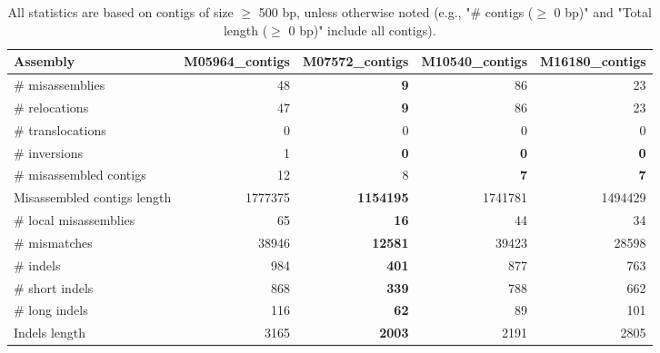 \documentclass[12pt,a4paper]{article}
\begin{document}
\begin{table}[ht]
\begin{center}
\caption{All statistics are based on contigs of size $\geq$ 500 bp, unless otherwise noted (e.g., "\# contigs ($\geq$ 0 bp)" and "Total length ($\geq$ 0 bp)" include all contigs).}
\begin{tabular}{|l*{4}{|r}|}
\hline
Assembly & M05964\_contigs & M07572\_contigs & M10540\_contigs & M16180\_contigs \\ \hline
\# misassemblies & 48 & {\bf 9} & 86 & 23 \\ \hline
\hspace{5mm}\# relocations & 47 & {\bf 9} & 86 & 23 \\ \hline
\hspace{5mm}\# translocations & 0 & 0 & 0 & 0 \\ \hline
\hspace{5mm}\# inversions & 1 & {\bf 0} & {\bf 0} & {\bf 0} \\ \hline
\# misassembled contigs & 12 & 8 & {\bf 7} & {\bf 7} \\ \hline
Misassembled contigs length & 1777375 & {\bf 1154195} & 1741781 & 1494429 \\ \hline
\# local misassemblies & 65 & {\bf 16} & 44 & 34 \\ \hline
\# mismatches & 38946 & {\bf 12581} & 39423 & 28598 \\ \hline
\# indels & 984 & {\bf 401} & 877 & 763 \\ \hline
\hspace{5mm}\# short indels & 868 & {\bf 339} & 788 & 662 \\ \hline
\hspace{5mm}\# long indels & 116 & {\bf 62} & 89 & 101 \\ \hline
Indels length & 3165 & {\bf 2003} & 2191 & 2805 \\ \hline
\end{tabular}
\end{center}
\end{table}
\end{document}
